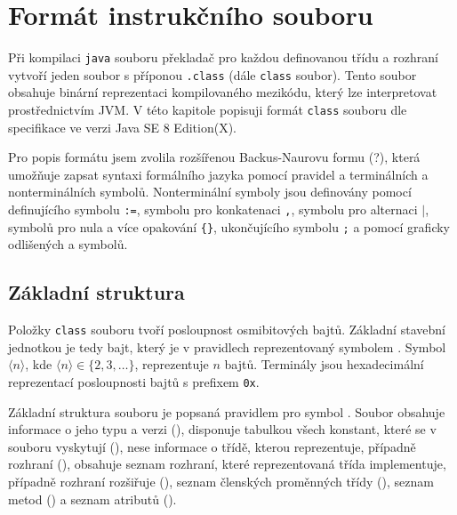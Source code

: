 \chapter{Formát instrukčního souboru}


Při kompilaci \texttt{java} souboru překladač pro každou definovanou třídu a rozhraní vytvoří jeden soubor s příponou \texttt{.class} (dále \texttt{class} soubor). Tento soubor obsahuje binární reprezentaci kompilovaného mezikódu, který lze interpretovat prostřednictvím JVM. V této kapitole popisuji formát \texttt{class} souboru dle specifikace ve verzi Java SE 8 Edition(X).

Pro popis formátu jsem zvolila rozšířenou Backus-Naurovu formu (?), která umožňuje zapsat syntaxi formálního jazyka pomocí pravidel a terminálních a nonterminálních symbolů. Nonterminální symboly jsou definovány pomocí definujícího symbolu \texttt{:=}, symbolu pro konkatenaci \texttt{,}, symbolu pro alternaci \texttt{$\mathtt{|}$}, symbolů pro nula a více opakování \texttt{\{\}}, ukončujícího symbolu \texttt{;} a pomocí graficky odlišených  a  symbolů.

\section{Základní struktura}


Položky \texttt{class} souboru tvoří posloupnost osmibitových bajtů. Základní stavební jednotkou je tedy bajt, který je v pravidlech reprezentovaný symbolem . Symbol $\langle n \rangle$, kde $\langle n \rangle \in \{2,3,\dots\}$, reprezentuje $n$ bajtů. Terminály jsou hexadecimální reprezentací posloupnosti bajtů s prefixem \texttt{0x}. 

Základní struktura souboru je popsaná pravidlem pro symbol . Soubor obsahuje informace o jeho typu a verzi (), disponuje tabulkou všech konstant, které se v souboru vyskytují (), nese informace o třídě, kterou reprezentuje, případně rozhraní (), obsahuje seznam rozhraní, které reprezentovaná třída implementuje, případně rozhraní rozšiřuje  (), seznam členských proměnných třídy (), seznam metod () a seznam atributů ().

